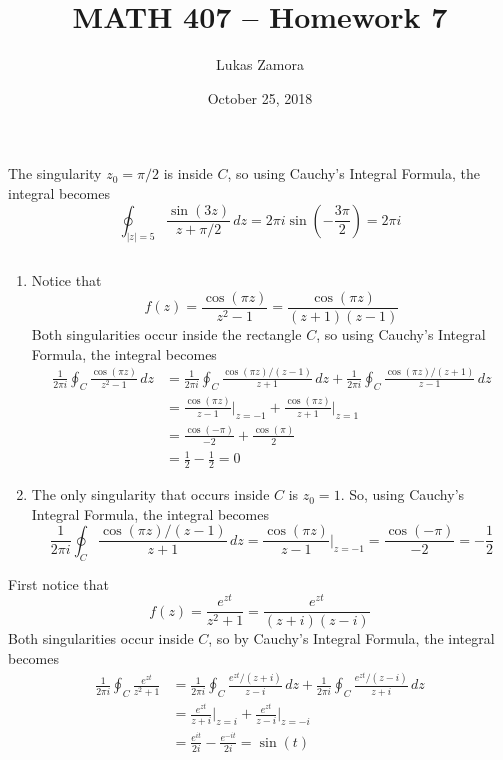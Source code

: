 \documentclass{article}
\title{MATH 407 -- Homework 7}
\author{Lukas Zamora}
\date{October 25, 2018}
\theoremstyle{definition}
\begin{document}
    \maketitle
    
    \begin{prob}{5.31} $  $ \vspace{2mm} \\
    	 The singularity $ z_0 = \pi/2 $ is inside $ C $, so using Cauchy's Integral Formula, the integral becomes
		\[
    		\oint_{|z|=5} \frac{\sin(3z)}{z+\pi/2} \, dz = 2\pi i \sin\left( -\frac{3\pi}{2} \right) = \boxed{2\pi i}
    	\]
    \end{prob}
    
    
    \begin{prob}{5.33} $  $
    	\begin{enumerate}[label=\alph*.)]
    		\item Notice that 
    			\[ f(z) = \frac{\cos(\pi z)}{z^2-1} = \frac{\cos(\pi z)}{(z+1)(z-1)} \]
    			Both singularities occur inside the rectangle $ C $, so using Cauchy's Integral Formula, the integral becomes
    			\begin{align*}
    				\frac{1}{2\pi i} \oint_C \frac{\cos(\pi z)}{z^2-1} \, dz &= \frac{1}{2\pi i} \oint_C \frac{\cos(\pi z) / (z-1)}{z+1} \, dz + \frac{1}{2\pi i} \oint_C \frac{\cos(\pi z)/(z+1)}{z-1} \, dz \\
    				&= \frac{\cos(\pi z)}{z-1} \Bigg|_{z=-1} + \frac{\cos(\pi z)}{z+1} \Bigg|_{z=1} \\
    				&= \frac{\cos(-\pi)}{-2} + \frac{\cos(\pi)}{2} \\
    				&= \frac{1}{2} - \frac{1}{2} = \boxed{0}
    			\end{align*}
    		
    		\item The only singularity that occurs inside $ C $ is $ z_0 = 1 $. So, using Cauchy's Integral Formula, the integral becomes
    			\[ \frac{1}{2\pi i} \oint_C \frac{\cos(\pi z)/(z-1)}{z+1} \, dz = \frac{\cos(\pi z)}{z-1} \Bigg|_{z=-1} = \frac{\cos(-\pi)}{-2} = \boxed{-\frac{1}{2}} \]
    	\end{enumerate}
    \end{prob}
    
    
    
    \begin{prob}{5.34} $  $ \vspace{2mm} \\
    	First notice that 
    	\[ f(z) = \frac{e^{zt}}{z^2+1} = \frac{e^{zt}}{(z+i)(z-i)} \]
    	Both singularities occur inside $ C $, so by Cauchy's Integral Formula, the integral becomes
    		\begin{align*}
    			\frac{1}{2\pi i} \oint_C \frac{e^{zt}}{z^2+1} &= \frac{1}{2\pi i} \oint_C \frac{e^{zt}/(z+i)}{z-i} \, dz + \frac{1}{2\pi i} \oint_C \frac{e^{zt}/(z-i)}{z+i} \, dz \\
    			&= \frac{e^{zt}}{z+i} \Bigg|_{z=i} + \frac{e^{zt}}{z-i} \Bigg|_{z=-i} \\
    			&= \frac{e^{it}}{2i} - \frac{e^{-it}}{2i} = \boxed{\sin(t)}
    		\end{align*}
    \end{prob}
    
\end{document}
